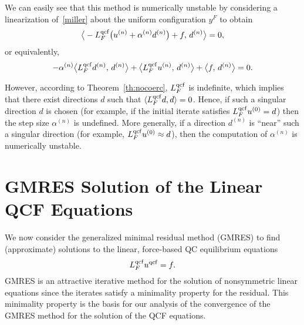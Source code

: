 \documentclass[12pt,reqno]{amsart}
\begin{document}
We can easily see that this method is numerically unstable by
considering a linearization of~\eqref{miller} about the uniform
configuration $y^F$ to obtain
\begin{equation*}
  \big{\langle}-{L^{{\rm qcf}}_F}\big(u^{(n)}+\alpha^{(n)} d^{(n)}\big)
  + f ,\, d^{(n)}\big{\rangle}= 0,
\end{equation*}
or equivalently,
\begin{equation*}
  - \alpha^{(n)} \big{\langle} {L^{{\rm qcf}}_F} d^{(n)},\, d^{(n)} \big{\rangle}
  + \big{\langle} {L^{{\rm qcf}}_F} u^{(n)},\, d^{(n)} \big{\rangle}
  + \big{\langle} f,\, d^{(n)} \big{\rangle} = 0.
\end{equation*}

However, according to Theorem~\ref{th:nocoerc}, ${L^{{\rm qcf}}_F}$ is indefinite,
which implies that there exist directions $d$ such that ${\langle} {L^{{\rm qcf}}_F} d, d
{\rangle} = 0$. Hence, if such a singular direction $d$ is chosen (for
example, if the initial iterate satisfies ${L^{{\rm qcf}}_F} u^{(0)} = d$) then the
step size $\alpha^{(n)}$ is undefined. More generally, if a direction
$d^{(n)}$ is ``near'' such a singular direction (for example, ${L^{{\rm qcf}}_F}
u^{(0)} \approx d$), then the computation of $\alpha^{(n)}$ is
numerically unstable.

\section{GMRES Solution of the Linear QCF Equations}
\label{sec:gmres}
We now consider the generalized minimal residual method (GMRES) to
find (approximate) solutions to the linear, force-based QC equilibrium
equations
\begin{equation}
  {L^{{\rm qcf}}_F} {u^{{\rm qcf}}} = f
  \label{eq:Lqcf_eq}.
\end{equation}
GMRES is an attractive iterative method for the solution of
nonsymmetric linear equations since the iterates satisfy a minimality
property for the residual.  This minimality property is the basis for
our analysis of the convergence of the GMRES method for the solution
of the QCF equations.
\end{document}
